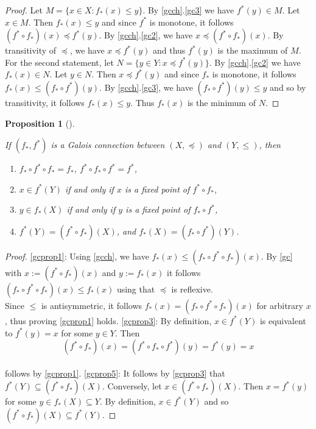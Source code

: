 \documentclass[
  twoside,
  12pt,
  letterpaper,
  fleqn]{article}
\providecommand{\tightlist}{%
  \setlength{\itemsep}{0pt}\setlength{\parskip}{0pt}}\usepackage{longtable,booktabs,array}
\theoremstyle{plain}
\newtheorem{proposition}{Proposition}[section]
\theoremstyle{definition}
\theoremstyle{definition}
\theoremstyle{remark}
\begin{document}
\begin{proof}

Let \(M=\{x\in X: f_*(x)\leqslant y\}\). By \eqref{gcch}.\eqref{gc3} we
have \(f^*(y)\in M\). Let \(x\in M\). Then \(f_*(x)\leqslant y\) and
since \(f^*\) is monotone, it follows
\((f^*\circ f_*)(x)\preceq f^*(y)\). By \eqref{gcch}.\eqref{gc2}, we
have \(x\preceq (f^*\circ f_*)(x)\). By transitivity of \(\preceq\), we
have \(x\preceq f^*(y)\) and thus \(f^*(y)\) is the maximum of \(M\).
For the second statement, let \(N=\{y\in Y : x\preceq f^*(y)\}\). By
\eqref{gcch}.\eqref{gc2} we have \(f_*(x)\in N\). Let \(y\in N\). Then
\(x\preceq f^*(y)\) and since \(f_*\) is monotone, it follows
\(f_*(x)\leqslant (f_*\circ f^*)(y)\). By \eqref{gcch}.\eqref{gc3}, we
have \((f_*\circ f^*)(y)\leqslant y\) and so by transitivity, it follows
\(f_*(x)\leqslant y\). Thus \(f_*(x)\) is the minimum of \(N\).

\end{proof}

\begin{proposition}[]\protect\hypertarget{prp-}{}\label{prp-}

If \((f_*, f^*)\) is a Galois connection between \((X,\preceq)\) and
\((Y,\leqslant)\), then

\begin{enumerate}
\def\labelenumi{\arabic{enumi}.}
\tightlist
\item
  \(f_*\circ f^* \circ f_*=f_*\), \(f^*\circ f_* \circ f^*=f^*\),
\item
  \(x\in f^*(Y)\) if and only if \(x\) is a fixed point of
  \(f^*\circ f_*\),
\item
  \(y\in f_*(X)\) if and only if \(y\) is a fixed point of
  \(f_*\circ f^*\),
\item
  \(f^*(Y)=(f^*\circ f_*)(X)\), and \(f_*(X)=(f_*\circ f^*)(Y)\).
\end{enumerate}

\end{proposition}

\begin{proof}

\eqref{gcprop1}: Using \eqref{gcch}, we have
\(f_*(x)\leqslant (f_*\circ f^*\circ f_*)(x)\). By \eqref{gc} with
\(x:=(f^*\circ f_*)(x)\) and \(y:=f_*(x)\) it follows
\((f_*\circ f^* \circ f_*)(x)\leqslant f_*(x)\) using that \(\preceq\)
is reflexive.\\
Since \(\leqslant\) is antisymmetric, it follows
\(f_*(x)=(f_*\circ f^*\circ f_*)(x)\) for arbitrary \(x\), thus proving
\eqref{gcprop1} holds. \eqref{gcprop3}: By definition, \(x\in f^*(Y)\)
is equivalent to \(f^*(y)=x\) for some \(y\in Y\). Then \[
(f^*\circ f_*)(x)=(f^*\circ f_* \circ f^*)(y)=f^*(y)=x
\]\\
follows by \eqref{gcprop1}. \eqref{gcprop5}: It follows by
\eqref{gcprop3} that \(f^*(Y)\subseteq (f^*\circ f_*)(X)\). Conversely,
let \(x\in (f^*\circ f_*)(X)\). Then \(x=f^*(y)\) for some
\(y\in f_*(X)\subseteq Y\). By definition, \(x\in f^*(Y)\) and so
\((f^*\circ f_*)(X)\subseteq f^*(Y)\).

\end{proof}
\end{document}

